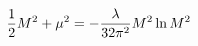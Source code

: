 \begin{equation}
\label{diciotto}  
{1 \over 2} M^2  +   \mu ^2 = - {\lambda \over {32 \pi ^ 2}} M^2 \ln {M^2}
\end{equation}

